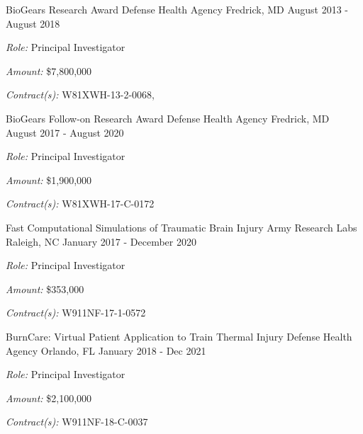 
\begin{cventries}

  \cventry
    {BioGears Research Award} %
    {Defense Health Agency} %
    {Fredrick, MD} %
    {August 2013 - August 2018} %
     {
     \begin{cvitems}
     \item{\textit{Role:} Principal Investigator}
     \item{\textit{Amount:} \$7,800,000}
     \item{\textit{Contract(s):} W81XWH-13-2-0068,}
     \end{cvitems}
     }

  \cventry
    {BioGears Follow-on Research Award} %
    {Defense Health Agency} %
    {Fredrick, MD} %
    {August 2017 - August 2020} %
     {
     \begin{cvitems}
     \item{\textit{Role:} Principal Investigator}
     \item{\textit{Amount:} \$1,900,000}
     \item{\textit{Contract(s):} W81XWH-17-C-0172}
     \end{cvitems}
     }

  \cventry
    {Fast Computational Simulations of Traumatic Brain Injury} %
    {Army Research Labs} %
    {Raleigh, NC} %
    {January 2017 - December 2020} %
     {
     \begin{cvitems}
     \item{\textit{Role:} Principal Investigator}
     \item{\textit{Amount:} \$353,000}
    \item{\textit{Contract(s):} W911NF-17-1-0572}
     \end{cvitems}
     }

  \cventry
    {BurnCare: Virtual Patient Application to Train Thermal Injury} %
    {Defense Health Agency} %
    {Orlando, FL} %
    {January 2018 - Dec 2021} %
     {
    \begin{cvitems}
     \item{\textit{Role:} Principal Investigator}
     \item{\textit{Amount:} \$2,100,000}
    \item{\textit{Contract(s):} W911NF-18-C-0037}
    \end{cvitems}
     }


\end{cventries}
